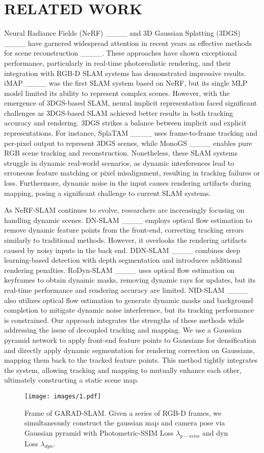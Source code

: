 \section{RELATED WORK}
Neural Radiance Fields (NeRF) ____ and 3D Gaussian Splatting (3DGS) ____ have garnered widespread attention in recent years as effective methods for scene reconstruction ____. These approaches have shown exceptional performance, particularly in real-time photorealistic rendering, and their integration with RGB-D SLAM systems has demonstrated impressive results. iMAP ____ was the first SLAM system based on NeRF, but its single MLP model limited its ability to represent complex scenes. However, with the emergence of 3DGS-based SLAM, neural implicit representation faced significant challenges as 3DGS-based SLAM achieved better results in both tracking accuracy and rendering. 3DGS strikes a balance between implicit and explicit representations. For instance, SplaTAM ____ uses frame-to-frame tracking and per-pixel output to represent 3DGS scenes, while MonoGS ____ enables pure RGB scene tracking and reconstruction. Nonetheless, these SLAM systems struggle in dynamic real-world scenarios, as dynamic interferences lead to erroneous feature matching or pixel misalignment, resulting in tracking failures or loss. Furthermore, dynamic noise in the input causes rendering artifacts during mapping, posing a significant challenge to current SLAM systems.

As NeRF-SLAM continues to evolve, researchers are increasingly focusing on handling dynamic scenes. DN-SLAM ____ employs optical flow estimation to remove dynamic feature points from the front-end, correcting tracking errors similarly to traditional methods. However, it overlooks the rendering artifacts caused by noisy inputs in the back end. DDN-SLAM ____ combines deep learning-based detection with depth segmentation and introduces additional rendering penalties. RoDyn-SLAM ____ uses optical flow estimation on keyframes to obtain dynamic masks, removing dynamic rays for updates, but its real-time performance and rendering accuracy are limited. NID-SLAM ____ also utilizes optical flow estimation to generate dynamic masks and background completion to mitigate dynamic noise interference, but its tracking performance is constrained. Our approach integrates the strengths of these methods while addressing the issue of decoupled tracking and mapping. We use a Gaussian pyramid network to apply front-end feature points to Gaussians for densification and directly apply dynamic segmentation for rendering correction on Gaussians, mapping them back to the tracked feature points. This method tightly integrates the system, allowing tracking and mapping to mutually enhance each other, ultimately constructing a static scene map.

\begin{figure*}[t]
  \centering
  \texttt{[image: images/1.pdf]}
  \caption{Frame of GARAD-SLAM. Given a series of RGB-D frames, we simultaneously construct the gaussian map and camera pose via Gaussian pyramid with Photometric-SSIM Loss $\lambda _{p-ssim}$ and dyn Loss $ \lambda _{dyn}$.  }
  \vspace{-15pt}  %
  \label{fig2}
\end{figure*}